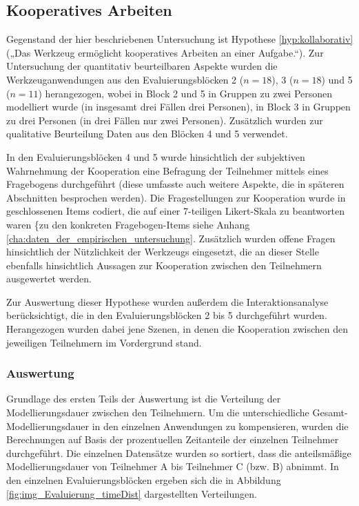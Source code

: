 
\subsection{Kooperatives Arbeiten} %
\label{sub:kollaboratives_arbeiten}

Gegenstand der hier beschriebenen Untersuchung ist Hypothese \ref{hyp:kollaborativ} („Das Werkzeug ermöglicht kooperatives Arbeiten an einer Aufgabe.“). Zur Untersuchung der quantitativ beurteilbaren Aspekte wurden die Werkzeuganwendungen aus den Evaluierungsblöcken 2 ($n=18$), 3 ($n=18$) und 5 ($n=11$) herangezogen, wobei in Block 2 und 5 in Gruppen zu zwei Personen modelliert wurde (in insgesamt drei Fällen drei Personen), in Block 3 in Gruppen zu drei Personen (in drei Fällen nur zwei Personen). Zusätzlich wurden zur qualitative Beurteilung Daten aus den Blöcken 4 und 5 verwendet.

In den Evaluierungsblöcken 4 und 5 wurde hinsichtlich der subjektiven Wahrnehmung der Kooperation eine Befragung der Teilnehmer mittels eines Fragebogens durchgeführt (diese umfasste auch weitere Aspekte, die in späteren Abschnitten besprochen werden). Die Fragestellungen zur Kooperation wurde in geschlossenen Items codiert, die auf einer 7-teiligen Likert-Skala zu beantworten waren \{zu den konkreten Fragebogen-Items siehe Anhang \ref{cha:daten_der_empirischen_untersuchung}. Zusätzlich wurden offene Fragen hinsichtlich der Nützlichkeit der Werkzeugs eingesetzt, die an dieser Stelle ebenfalls hinsichtlich Aussagen zur Kooperation zwischen den Teilnehmern ausgewertet werden. 

Zur Auswertung dieser Hypothese wurden außerdem die Interaktionsanalyse berücksichtigt, die in den Evaluierungsblöcken 2 bis 5 durchgeführt wurden. Herangezogen wurden dabei jene Szenen, in denen die Kooperation zwischen den jeweiligen Teilnehmern im Vordergrund stand.

\subsubsection{Auswertung} %

Grundlage des ersten Teils der Auswertung ist die Verteilung der Modellierungsdauer zwischen den Teilnehmern. Um die unterschiedliche Gesamt-Modellierungsdauer in den einzelnen Anwendungen zu kompensieren, wurden die Berechnungen auf Basis der prozentuellen Zeitanteile der einzelnen Teilnehmer durchgeführt. Die einzelnen Datensätze wurden so sortiert, dass die anteilsmäßige Modellierungsdauer von Teilnehmer A bis Teilnehmer C (bzw. B) abnimmt. In den einzelnen Evaluierungsblöcken ergeben sich die in Abbildung \ref{fig:img_Evaluierung_timeDist} dargestellten Verteilungen.

